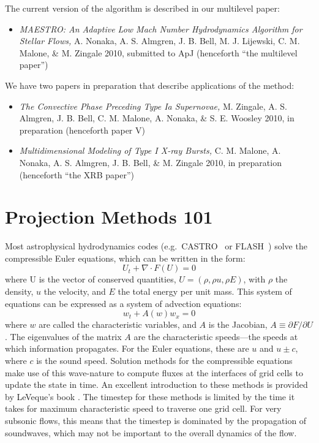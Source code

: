 \noindent The current version of the algorithm is described in our
multilevel paper:
\begin{itemize}
\item {\em MAESTRO: An Adaptive Low Mach Number Hydrodynamics Algorithm for Stellar
  Flows,} A. Nonaka, A. S. Almgren, J. B. Bell, M. J. Lijewski, C. M. Malone,
  \& M. Zingale 2010, submitted to ApJ
  (henceforth ``the multilevel paper'')
\end{itemize}

\noindent We have two papers in preparation that describe applications of the
method:
\begin{itemize}
\item {\em The Convective Phase Preceding Type Ia Supernovae,}
  M. Zingale, A. S. Almgren, J. B. Bell, C. M. Malone, A. Nonaka, \& S. E. Woosley 2010,
  in preparation (henceforth paper V)
\item {\em Multidimensional Modeling of Type I X-ray Bursts,}
  C. M. Malone, A. Nonaka, A. S. Almgren, J. B. Bell, \& M. Zingale 2010,
  in preparation (henceforth ``the XRB paper'')
\end{itemize}


\section{Projection Methods 101}

Most astrophysical hydrodynamics codes
(e.g.\ CASTRO~\cite{castro} or FLASH~\cite{flash}) solve the
compressible Euler equations, which can be written in the form:
\begin{equation}
U_t + \nabla \cdot F(U) = 0
\end{equation}
where U is the vector of conserved quantities, $U = (\rho, \rho u,
\rho E)$, with $\rho$ the density, $u$ the velocity, and $E$ the total
energy per unit mass.  This system of equations can be expressed 
as a system of advection equations:
\begin{equation}
w_t + A(w) w_x = 0
\end{equation}
where $w$ are called the characteristic variables, and $A$ is the
Jacobian, $A \equiv \partial F / \partial U$.  The eigenvalues of the
matrix $A$ are the characteristic speeds---the speeds at which
information propagates.  For the Euler equations, these are $u$ and $u
\pm c$, where $c$ is the sound speed.  Solution methods for the
compressible equations make use of this wave-nature to compute fluxes
at the interfaces of grid cells to update the state in time.  An
excellent introduction to these methods is provided by LeVeque's book
\cite{leveque}.  The timestep for these methods is limited by the time
it takes for maximum characteristic speed to traverse one grid cell.
For very subsonic flows, this means that the timestep is dominated by
the propagation of soundwaves, which may not be important to the
overall dynamics of the flow.


